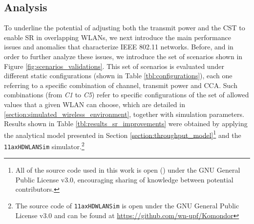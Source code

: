 \documentclass[preprint,12pt]{elsarticle}
\begin{document}
\subsection{Analysis}
\label{section:spatial_reuse_enhancement}  
To underline the potential of adjusting both the transmit power and the CST to enable SR in overlapping WLANs, we next introduce the main performance issues and anomalies that characterize IEEE 802.11 networks. Before, and in order to further analyze these issues, we introduce the set of scenarios shown in Figure \ref{fig:scenarios_validations}. This set of scenarios is evaluated under different static configurations (shown in Table \ref{tbl:configurations}), each one referring to a specific combination of channel, transmit power and CCA. Such combinations (from \emph{C1} to \emph{C5}) refer to specific configurations of the set of allowed values that a given WLAN can choose, which are detailed in \ref{section:simulated_wireless_environment}, together with simulation parameters. Results shown in Table \ref{tbl:results_sr_improvements} were obtained by applying the analytical model presented in Section \ref{section:throughput_model}\footnote{All of the source code used in this work is open (\citealp{fwilhelmi2018code}) under the GNU General Public License v3.0, encouraging sharing of knowledge between potential contributors.} and the \texttt{11axHDWLANSim} simulator.\footnote{The source code of \texttt{11axHDWLANSim} is open under the GNU General Public License v3.0 and can be found at \url{https://github.com/wn-upf/Komondor}}
\end{document}
